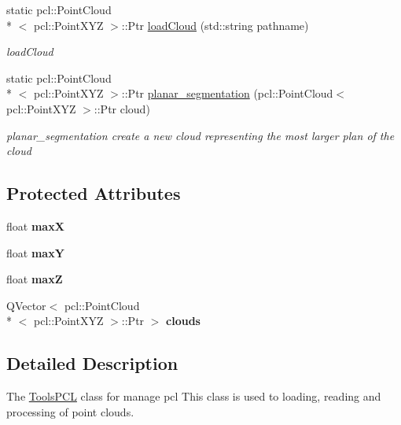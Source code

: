 \begin{DoxyCompactItemize}
static pcl\-::\-Point\-Cloud\\*
$<$ pcl\-::\-Point\-X\-Y\-Z $>$\-::Ptr \hyperlink{classToolsPCL_a852f0884ba496b7b2a3a77aabf3923f5}{load\-Cloud} (std\-::string pathname)
\begin{DoxyCompactList}\small\item\em load\-Cloud \end{DoxyCompactList}\item 
static pcl\-::\-Point\-Cloud\\*
$<$ pcl\-::\-Point\-X\-Y\-Z $>$\-::Ptr \hyperlink{classToolsPCL_a302c666bcdd57fd901da32b4581dec5b}{planar\-\_\-segmentation} (pcl\-::\-Point\-Cloud$<$ pcl\-::\-Point\-X\-Y\-Z $>$\-::Ptr cloud)
\begin{DoxyCompactList}\small\item\em planar\-\_\-segmentation create a new cloud representing the most larger plan of the cloud \end{DoxyCompactList}\end{DoxyCompactItemize}
\subsection*{Protected Attributes}
\begin{DoxyCompactItemize}
\item 
\hypertarget{classToolsPCL_a748c8d7a5d782653d3a2afd16d264c21}{float {\bfseries max\-X}}\label{classToolsPCL_a748c8d7a5d782653d3a2afd16d264c21}

\item 
\hypertarget{classToolsPCL_a77aa641be7ca591bfe112d42d3fe84fd}{float {\bfseries max\-Y}}\label{classToolsPCL_a77aa641be7ca591bfe112d42d3fe84fd}

\item 
\hypertarget{classToolsPCL_a5d716f4c7228045bd41d347b262e0e85}{float {\bfseries max\-Z}}\label{classToolsPCL_a5d716f4c7228045bd41d347b262e0e85}

\item 
\hypertarget{classToolsPCL_abeb013b3aadaeedc362e7cf136459e96}{Q\-Vector$<$ pcl\-::\-Point\-Cloud\\*
$<$ pcl\-::\-Point\-X\-Y\-Z $>$\-::Ptr $>$ {\bfseries clouds}}\label{classToolsPCL_abeb013b3aadaeedc362e7cf136459e96}

\end{DoxyCompactItemize}


\subsection{Detailed Description}
The \hyperlink{classToolsPCL}{Tools\-P\-C\-L} class for manage pcl This class is used to loading, reading and processing of point clouds. 

